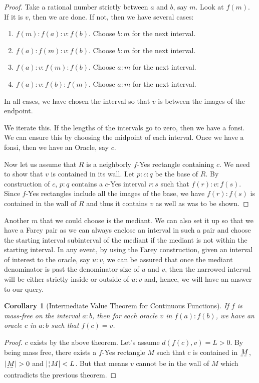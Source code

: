 \documentclass[12pt]{article}
\newtheorem{corollary}{Corollary}[subsection]
\theoremstyle{remark}
\begin{document}
\begin{proof}
Take a rational number strictly between $a$ and $b$, say $m$. Look at $f(m)$. If it is $v$, then we are done. If not, then we have several cases: 
\begin{enumerate}
\item $f(m):f(a):v:f(b)$. Choose $b:m$ for the next interval.
\item $f(a):f(m):v:f(b)$. Choose $b:m$ for the next interval. 
\item $f(a):v:f(m):f(b)$. Choose $a:m$ for the next interval.
\item $f(a):v:f(b):f(m)$. Choose $a:m$ for the next interval. 
\end{enumerate}
In all cases, we have chosen the interval so that $v$ is between the images of the endpoint. 

We iterate this. If the lengths of the intervals go to zero, then we have a fonsi. We can ensure this by choosing the midpoint of each interval. Once we have a fonsi, then we have an Oracle, say $c$. 

Now let us assume that $R$ is a neighborly $f$-Yes rectangle containing $c$. We need to show that $v$ is contained in its wall. Let $p:c:q$ be the base of $R$. By construction of $c$, $p:q$ contains a $c$-Yes interval $r:s$ such that $f(r):v:f(s)$. Since $f$-Yes rectangles include all the images of the base, we have $f(r):f(s)$ is contained in the wall of $R$ and thus it contains $v$ as well as was to be shown. 
\end{proof}

Another $m$ that we could choose is the mediant. We can also set it up so that we have a Farey pair as we can always enclose an interval in such a pair and choose the starting interval subinterval of the mediant if the mediant is not within the starting interval. In any event, by using the Farey construction, given an interval of interest to the oracle, say $u:v$, we can be assured that once the mediant denominator is past the denominator size of $u$ and $v$, then the narrowed interval will be either strictly inside or outside of $u:v$ and, hence, we will have an answer to our query. 

\begin{corollary}[Intermediate Value Theorem for Continuous Functions]
If $f$ is mass-free on the interval $a:b$, then for each oracle $v$ in $f(a):f(b)$, we have an oracle $c$ in $a:b$ such that $f(c)=v$.
\end{corollary}

\begin{proof}
$c$ exists by the above theorem. Let's assume $d(f(c), v) = L > 0$. By being mass free, there exists a $f$-Yes rectangle $M$ such that $c$ is contained in $\base{M}$, $|\base{M}| > 0$ and $|\wall{M}| < L$. But that means $v$ cannot be in the wall of $M$ which contradicts the previous theorem. 
\end{proof}
    
\end{document}
